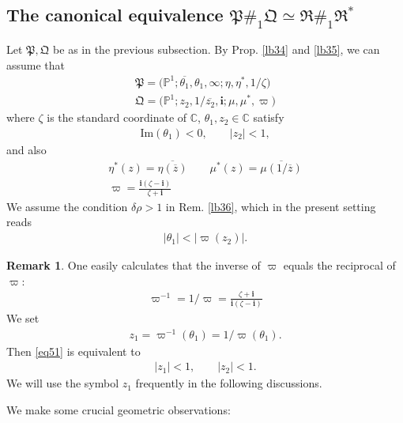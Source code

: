 \documentclass[11pt,b5paper,notitlepage]{article}
\theoremstyle{definition}
\newtheorem{rem}[df]{Remark}
\theoremstyle{plain}
\newcommand{\fk}{\mathfrak}
\newcommand{\ovl}{\overline}
\newcommand{\im}{\mathbf{i}}
\newcommand{\Cbb}{\mathbb C}
\newcommand{\Pbb}{\mathbb P}
\newcommand{\Imag}{\mathrm{Im}}
\numberwithin{equation}{section}
\begin{document}
\subsection{The canonical equivalence $\fk P\#_1\fk Q\simeq\fk R\#_1\fk R^*$}\label{lb46}

Let $\fk P,\fk Q$ be as in the previous subsection. By Prop. \ref{lb34} and \ref{lb35}, we can assume that
\begin{subequations}\label{eq58}
\begin{gather}
\fk P=\big(\Pbb^1;\ovl{\theta_1},\theta_1,\infty;\eta,\eta^*,1/\zeta\big)  \label{eq56}\\
\fk Q=\big(\Pbb^1;z_2,1/\ovl{z_2},\im;\mu,\mu^*,\varpi\big)  \label{eq57}
\end{gather}
\end{subequations}
where $\zeta$ is the standard coordinate of $\Cbb$, $\theta_1,z_2\in\Cbb$ satisfy
\begin{align}
\Imag(\theta_1)<0,\qquad |z_2|<1,  \label{eq51}
\end{align}
and also
\begin{gather*}
\eta^*(z)=\ovl{\eta(\ovl z)}\qquad \mu^*(z)=\ovl{\mu(1/\ovl z)}\\
\varpi=\frac{\im(\zeta-\im)}{\zeta+\im}
\end{gather*}
We assume the condition $\delta\rho>1$ in Rem. \ref{lb36}, which in the present setting reads
\begin{align}
|\theta_1|<|\varpi(z_2)|.  \label{eq59}
\end{align}


\begin{rem}
One easily calculates that the inverse of $\varpi$ equals the reciprocal of $\varpi$:
\begin{align*}
\varpi^{-1}=1/\varpi=\frac{\zeta+\im}{\im(\zeta-\im)}
\end{align*}
We set
\begin{align*}
z_1=\varpi^{-1}(\theta_1)=1/\varpi(\theta_1).
\end{align*}
Then \eqref{eq51} is equivalent to
\begin{align*}
|z_1|<1,\qquad |z_2|<1.
\end{align*}
We will use the symbol $z_1$ frequently in the following discussions.
\end{rem}


We make some crucial geometric observations:
\end{document}
